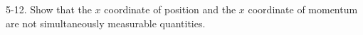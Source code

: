 \documentclass[12pt]{article}
\begin{document}
5-12.
Show that the $x$ coordinate of position and the
$x$ coordinate of momentum are not simultaneously
measurable quantities.

\end{document}
